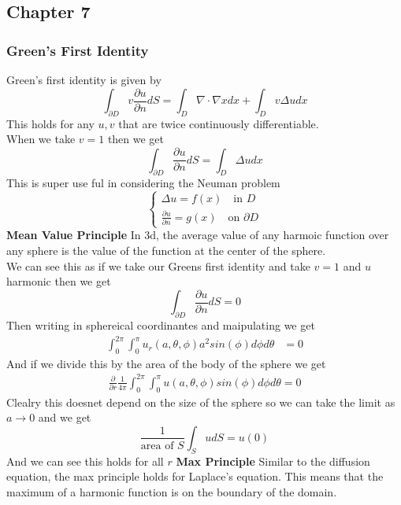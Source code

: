 \documentclass[answers,12pt,addpoints]{exam}
\begin{document}
    \subsection{Chapter 7}
    \subsubsection{Green's First Identity }
    Green's first identity is given by
    $$ \int_{\partial D} v \frac{\partial u}{\partial n} dS= \int_{D} \nabla  \cdot \nabla x dx + \int_{D} v \Delta u dx$$
    This holds for any $u, v$ that are twice continuously differentiable.\\
    When we take $v =1$ then we get 
    $$ \int_{\partial D} \frac{\partial u}{\partial n} dS = \int_{D} \Delta u dx$$
    This is super use ful in considering the Neuman problem 
    $$ \begin{cases}
        \Delta u = f(x) \quad \text{in } D\\
        \frac{\partial u}{\partial n} = g(x) \quad \text{on } \partial D
    \end{cases}$$
    \textbf{Mean Value Principle}
    In 3d, the average value of any harmoic function over any sphere is the value of the function at the center of the sphere.\\
    We can see this as if we take our Greens first identity and take $v = 1$ and $u$ harmonic then we get
    $$ \int_{\partial D} \frac{\partial u}{\partial n} dS = 0$$
    Then writing in sphereical coordinantes and maipulating we get 
    \begin{align*}
        \int_0^{2\pi} \int_0^{\pi} u_r(a,\theta, \phi) a^2 sin(\phi) d\phi d\theta &= 0
    \end{align*}
    And if we divide this by the area of the body of the sphere we get
    \begin{align*}
        \frac{\partial}{\partial r} \frac{1}{4\pi} \int_{0}^{2\pi} \int_{0}^{\pi} u(a, \theta, \phi) sin(\phi) d\phi d\theta = 0
    \end{align*}
    Clealry this doesnet depend on the size of the sphere so we can take the limit as $a \to 0$ and we get
    $$ \frac{1}{\text{area of }S} \int_{S} u dS = u(0)$$
    And we can see this holds for all $r$
    \textbf{Max Principle}
    Similar to the diffusion equation, the max principle holds for Laplace's equation. This means that the maximum of a harmonic function is on the boundary of the domain.\\
    
\end{document}
